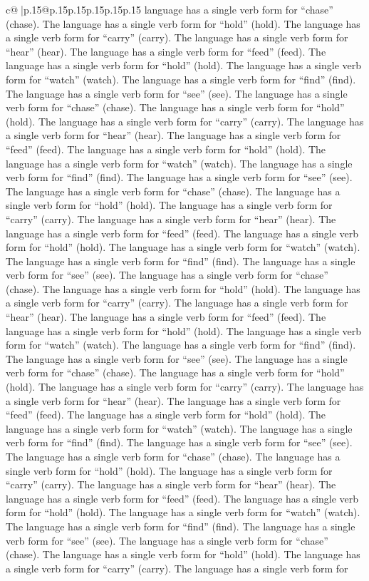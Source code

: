 \documentclass{article}
\begin{document}
{\begin{supertabular}{c@{$\;$}|p{.15\linewidth}@{}p{.15\linewidth}p{.15\linewidth}p{.15\linewidth}p{.15\linewidth}p{.15\linewidth}}
{{{language has a single verb form for “chase” (chase). The language has a single verb form for “hold” (hold). The language has a single verb form for “carry” (carry). The language has a single verb form for “hear” (hear). The language has a single verb form for “feed” (feed). The language has a single verb form for “hold” (hold). The language has a single verb form for “watch” (watch). The language has a single verb form for “find” (find). The language has a single verb form for “see” (see). The language has a single verb form for “chase” (chase). The language has a single verb form for “hold” (hold). The language has a single verb form for “carry” (carry). The language has a single verb form for “hear” (hear). The language has a single verb form for “feed” (feed). The language has a single verb form for “hold” (hold). The language has a single verb form for “watch” (watch). The language has a single verb form for “find” (find). The language has a single verb form for “see” (see). The language has a single verb form for “chase” (chase). The language has a single verb form for “hold” (hold). The language has a single verb form for “carry” (carry). The language has a single verb form for “hear” (hear). The language has a single verb form for “feed” (feed). The language has a single verb form for “hold” (hold). The language has a single verb form for “watch” (watch). The language has a single verb form for “find” (find). The language has a single verb form for “see” (see). The language has a single verb form for “chase” (chase). The language has a single verb form for “hold” (hold). The language has a single verb form for “carry” (carry). The language has a single verb form for “hear” (hear). The language has a single verb form for “feed” (feed). The language has a single verb form for “hold” (hold). The language has a single verb form for “watch” (watch). The language has a single verb form for “find” (find). The language has a single verb form for “see” (see). The language has a single verb form for “chase” (chase). The language has a single verb form for “hold” (hold). The language has a single verb form for “carry” (carry). The language has a single verb form for “hear” (hear). The language has a single verb form for “feed” (feed). The language has a single verb form for “hold” (hold). The language has a single verb form for “watch” (watch). The language has a single verb form for “find” (find). The language has a single verb form for “see” (see). The language has a single verb form for “chase” (chase). The language has a single verb form for “hold” (hold). The language has a single verb form for “carry” (carry). The language has a single verb form for “hear” (hear). The language has a single verb form for “feed” (feed). The language has a single verb form for “hold” (hold). The language has a single verb form for “watch” (watch). The language has a single verb form for “find” (find). The language has a single verb form for “see” (see). The language has a single verb form for “chase” (chase). The language has a single verb form for “hold” (hold). The language has a single verb form for “carry” (carry). The language has a single verb form for }}}
\end{supertabular}}
\end{document}
